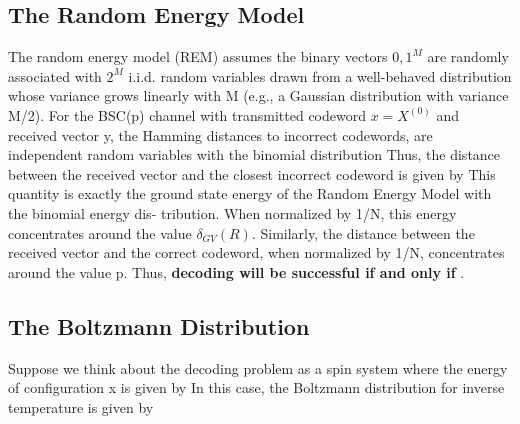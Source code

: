 \documentclass[letterpaper,english,10pt]{article}
\begin{document}
\subsection{The Random Energy Model}
The random energy model (REM) assumes the binary vectors ${0,1}^M$ are randomly associated with $2^M$ i.i.d. random variables drawn from a well-behaved distribution whose variance grows linearly with M (e.g., a Gaussian distribution with variance M/2).
For the BSC(p) channel with transmitted codeword $x = X^{(0)}$ and received vector y, the Hamming distances to incorrect codewords, 
 are independent random variables with the binomial distribution
Thus, the distance between the received vector and the closest incorrect codeword is given by
This quantity is exactly the ground state energy of the  Random Energy Model with the binomial energy dis- tribution. When normalized by 1/N, this energy concentrates around the value $\delta_{GV}(R)$. Similarly, the distance between the received vector and the correct codeword, when normalized by 1/N, concentrates around the value p. Thus, \textbf{decoding will be successful if and only if} 
.
\subsection{The Boltzmann Distribution}
Suppose we think about the decoding problem as a spin system where the energy of configuration x is given by
In this case, the Boltzmann distribution for inverse temperature is given by
\end{document}
